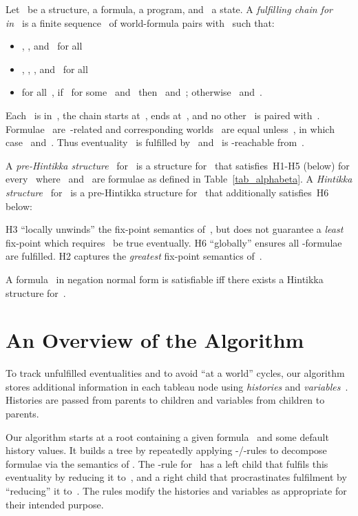 \documentclass{entcs}
\newcommand{\pdl}{}
\newcommand{\fear}{}
\begin{document}
\begin{definition}
  Let~ be a structure,  a formula,  a program, and~ a state.
  A \emph{fulfilling chain for~ in~}
  is a finite sequence~ of world-formula pairs with~ such that:
  \begin{itemize}
  \item , , and~ for all~
  \item , , , and~ for all~
  \item for all~,
    if~ for some~ and~
    then~ and~;
    otherwise~ and~.
  \end{itemize}
\end{definition}
Each~ is in~,
the chain starts at~, ends at~,
and no other~ is paired with~.
Formulae~ are~-related 
and corresponding worlds~ are equal
unless~,
in which case~ and~.
Thus eventuality~ is fulfilled by~
and~ is -reachable from~.

\begin{definition}
  A \emph{pre-Hintikka structure}~ for~
  is a structure for~
  that satisfies~H1-H5 (below) for every~
  where~ and~ are formulae as defined in Table~\ref{tab_alphabeta}.
  A \emph{Hintikka structure}~ for~
  is a pre-Hintikka structure for~
  that additionally satisfies~H6 below:
  
\end{definition}
H3 ``locally unwinds'' the fix-point semantics of~,
but does not guarantee a \emph{least} fix-point which 
requires~ be true eventually.
H6 ``globally''
ensures all \fear{}-formulae are fulfilled.
H2 captures the \emph{greatest} fix-point 
semantics of~.

\begin{theorem}
  \label{theo_satisfiable}
  A formula~ in negation normal form is satisfiable
  iff there exists a Hintikka structure for~.
\end{theorem}


\section{An Overview of the Algorithm}
\label{sec_overview}

To track unfulfilled eventualities and to avoid ``at a world'' cycles,
our algorithm stores additional information in each tableau node
using \emph{histories} and
\emph{variables}~\cite{schwendimann-one-pass}.
Histories are passed from parents to children and
variables from children to parents.

Our algorithm starts at a root
containing a given formula~
and some default history values.
It builds a tree by repeatedly applying -/-rules
to decompose formulae via the semantics of \pdl{}.
The -rule for~ has a left child
that fulfils this eventuality by reducing it to~,
and a right child
that procrastinates fulfilment by ``reducing'' it to~.
The rules modify the histories and variables as appropriate
for their intended purpose.
\end{document}
